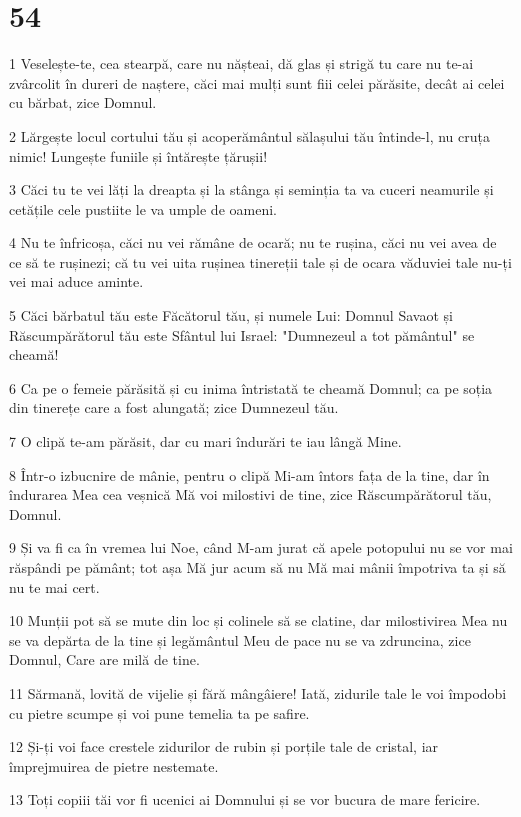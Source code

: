 \chapter{54}

\par 1 Veselește-te, cea stearpă, care nu nășteai, dă glas și strigă tu care nu te-ai zvârcolit în dureri de naștere, căci mai mulți sunt fiii celei părăsite, decât ai celei cu bărbat, zice Domnul.
\par 2 Lărgește locul cortului tău și acoperământul sălașului tău întinde-l, nu cruța nimic! Lungește funiile și întărește țărușii!
\par 3 Căci tu te vei lăți la dreapta și la stânga și seminția ta va cuceri neamurile și cetățile cele pustiite le va umple de oameni.
\par 4 Nu te înfricoșa, căci nu vei rămâne de ocară; nu te rușina, căci nu vei avea de ce să te rușinezi; că tu vei uita rușinea tinereții tale și de ocara văduviei tale nu-ți vei mai aduce aminte.
\par 5 Căci bărbatul tău este Făcătorul tău, și numele Lui: Domnul Savaot și Răscumpărătorul tău este Sfântul lui Israel: "Dumnezeul a tot pământul" se cheamă!
\par 6 Ca pe o femeie părăsită și cu inima întristată te cheamă Domnul; ca pe soția din tinerețe care a fost alungată; zice Dumnezeul tău.
\par 7 O clipă te-am părăsit, dar cu mari îndurări te iau lângă Mine.
\par 8 Într-o izbucnire de mânie, pentru o clipă Mi-am întors fața de la tine, dar în îndurarea Mea cea veșnică Mă voi milostivi de tine, zice Răscumpărătorul tău, Domnul.
\par 9 Și va fi ca în vremea lui Noe, când M-am jurat că apele potopului nu se vor mai răspândi pe pământ; tot așa Mă jur acum să nu Mă mai mânii împotriva ta și să nu te mai cert.
\par 10 Munții pot să se mute din loc și colinele să se clatine, dar milostivirea Mea nu se va depărta de la tine și legământul Meu de pace nu se va zdruncina, zice Domnul, Care are milă de tine.
\par 11 Sărmană, lovită de vijelie și fără mângâiere! Iată, zidurile tale le voi împodobi cu pietre scumpe și voi pune temelia ta pe safire.
\par 12 Și-ți voi face crestele zidurilor de rubin și porțile tale de cristal, iar împrejmuirea de pietre nestemate.
\par 13 Toți copiii tăi vor fi ucenici ai Domnului și se vor bucura de mare fericire.
